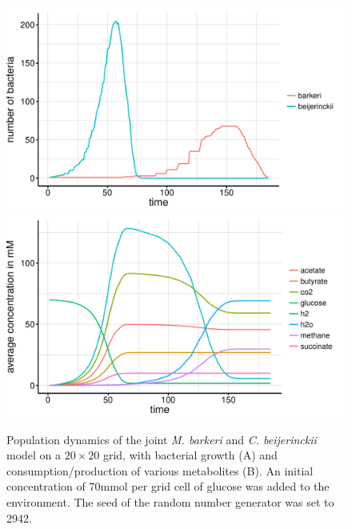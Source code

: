 \begin{figure}[h!]
  \centering
    \includegraphics[scale=0.45]{../results/img/barkeri_beijerinckii_20x20_seed2942_growth.pdf}
    \includegraphics[scale=0.45]{../results/img/barkeri_beijerinckii_20x20_seed2942_subs.pdf}
  \caption{Population dynamics of the joint \emph{M. barkeri} and \emph{C. beijerinckii} model on a $20\times20$ grid, with bacterial growth (A) and consumption/production of various metabolites (B). An initial concentration of 70\;mmol per grid cell of glucose was added to the environment. The seed of the random number generator was set to 2942.}
  \label{fig:cbsg}
\end{figure}
